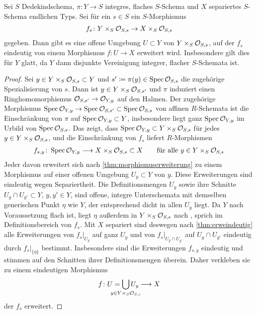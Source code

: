 \begin{Korollar}\label{thm:allgmorphismuserweiterung}
  Sei $S$ Dedekindschema,
  $\pi\colon Y\to S$ integres, flaches $S$-Schema
  und $X$ separiertes $S$-Schema endlichen Typs.
  Sei für ein $s\in S$ ein $S$-Morphismus
  \begin{gather*}
    f_s\colon Y\times_S\mathcal{O}_{S,s}\to X\times_S\mathcal{O}_{S,s}
  \end{gather*}
  gegeben.
  Dann gibt es eine offene Umgebung $U\subset Y$ von
  ${Y\times_S\mathcal{O}_{S,s}}$, auf der $f_s$ eindeutig von einem Morphismus
  ${f\colon U\to X}$ erweitert wird.
  Insbesondere gilt dies für $Y$ glatt, da $Y$ dann disjunkte
  Vereinigung integrer, flacher $S$-Schemata ist.
  \begin{proof}
    Sei $y\in Y\times_S\mathcal{O}_{S,s}\subset Y$ und
    $s'\coloneqq\pi(y)\in\operatorname{Spec}\mathcal{O}_{S,s}$ die zugehörige Spezialisierung
    von $s$. Dann ist $y\in Y\times_S\mathcal{O}_{S,s'}$ und $\pi$ induziert einen
    Ringhomomorphismus ${\mathcal{O}_{S,s'}\to\mathcal{O}_{Y,y}}$ auf den Halmen. Der
    zugehörige Morphismus
    ${\operatorname{Spec}\mathcal{O}_{Y,y}\to\operatorname{Spec}\mathcal{O}_{S,s'}\subset\operatorname{Spec}\mathcal{O}_{S,s}}$
    von affinen $R$-Schemata ist die Einschränkung von $\pi$ auf
    ${\operatorname{Spec}\mathcal{O}_{Y,y}\subset Y}$, insbesondere  liegt ganz $\operatorname{Spec}\mathcal{O}_{Y,y}$
    im Urbild von $\operatorname{Spec}\mathcal{O}_{S,s}$.
    Das zeigt, dass ${\operatorname{Spec}\mathcal{O}_{Y,y}\subset Y\times_S\mathcal{O}_{S,s}}$ für jedes
    ${y\in Y\times_S\mathcal{O}_{S,s}}$, und die Einschränkung von $f_s$ liefert
    $R$-Morphismen
    \begin{gather*}
      f_{s,y}\colon \operatorname{Spec}\mathcal{O}_{Y,y}\longrightarrow X\times_S\mathcal{O}_{S,s}\subset X
      \qquad \text{für alle } y \in Y\times_S\mathcal{O}_{S,s}
    \end{gather*}
    Jeder davon erweitert sich nach \ref{thm:morphismuserweiterung}
    zu einem Morphismus auf einer offenen Umgebung ${U_y\subset Y}$ von
    $y$.
    Diese Erweiterungen sind eindeutig wegen Separiertheit.
    Die Definitionsmengen $U_y$ sowie ihre Schnitte ${U_y\cap
    U_{y'}\subset Y}$, ${y,y'\in Y}$, sind offene, integre
    Unterschemata mit demselben generischen Punkt $\eta$ wie $Y$, der
    entsprechend dicht in allen $U_y$ liegt.
    Da $Y$ nach Voraussetzung flach ist, liegt $\eta$ außerdem in
    ${Y\times_S\mathcal{O}_{S,s}}$ nach \cite[Proposition~14.14]{wedhorn}, sprich
    im Definitionsbereich von $f_s$. Mit $X$ separiert sind deswegen nach
    \ref{thm:erweindeutig} alle Erweiterungen von $f_s|_{U_y}$ auf
    ganz $U_y$ und von $f_s|_{U_y\cap U_{y'}}$ auf ${U_y\cap U_{y'}}$
    eindeutig durch $f_s|_{\{\eta\}}$ bestimmt.
    Insbesondere sind die Erweiterungen $f_{s,y}$ eindeutig und
    stimmen auf den Schnitten ihrer Definitionsmengen überein.
    Daher verkleben sie zu einem eindeutigen Morphismus
    \begin{gather*}
      f\colon U=\bigcup_{\mathclap{y\in Y\times_S\O_{S,s}}} U_y\longto X
    \end{gather*}
    der $f_s$ erweitert.
  \end{proof}
\end{Korollar}
